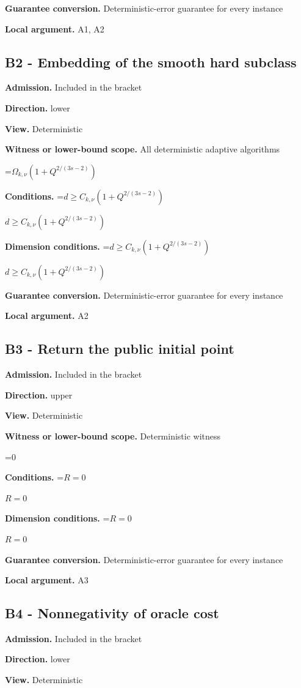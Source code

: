 \documentclass[10pt,a4paper]{article}
\newcommand{\AtlasMath}[1]{\par\begingroup\centering\setbox0=\hbox{$\displaystyle #1$}\ifdim\wd0>1.4\linewidth\typeout{ATLAS WIDE FORMULA: \the\wd0}\fi\ifdim\wd0>\linewidth\resizebox{\linewidth}{!}{\box0}\else\box0\fi\par\endgroup}
\newcommand{\AtlasInlineMath}[1]{\begingroup\setbox0=\hbox{$#1$}\ifdim\wd0>.4\linewidth\endgroup\AtlasMath{#1}\else\endgroup$#1$\fi}
\begin{document}
\textbf{Guarantee conversion.} Deterministic-error guarantee for every instance

\textbf{Local argument.} A1, A2

\subsection{B2 - Embedding of the smooth hard subclass}
\textbf{Admission.} Included in the bracket

\textbf{Direction.} lower

\textbf{View.} Deterministic

\textbf{Witness or lower-bound scope.} All deterministic adaptive algorithms

\AtlasMath{\Omega_{k,\nu}(1+Q^{2/(3s-2)})}
\textbf{Conditions.} \AtlasInlineMath{d\ge C_{k,\nu}(1+Q^{2/(3s-2)})}

\textbf{Dimension conditions.} \AtlasInlineMath{d\ge C_{k,\nu}(1+Q^{2/(3s-2)})}

\textbf{Guarantee conversion.} Deterministic-error guarantee for every instance

\textbf{Local argument.} A2

\subsection{B3 - Return the public initial point}
\textbf{Admission.} Included in the bracket

\textbf{Direction.} upper

\textbf{View.} Deterministic

\textbf{Witness or lower-bound scope.} Deterministic witness

\AtlasMath{0}
\textbf{Conditions.} \AtlasInlineMath{R=0}

\textbf{Dimension conditions.} \AtlasInlineMath{R=0}

\textbf{Guarantee conversion.} Deterministic-error guarantee for every instance

\textbf{Local argument.} A3

\subsection{B4 - Nonnegativity of oracle cost}
\textbf{Admission.} Included in the bracket

\textbf{Direction.} lower

\textbf{View.} Deterministic
\end{document}
